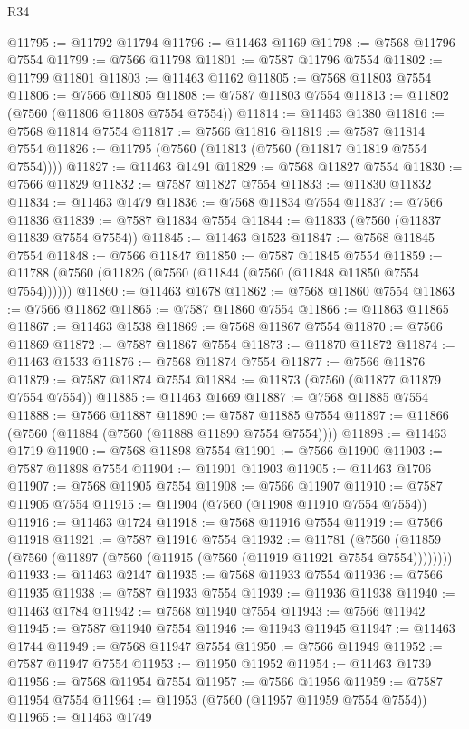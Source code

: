 \begin{lexlean}{R34}
\begin{coremodule}
@11795 := @11792 @11794
@11796 := @11463 @1169
@11798 := @7568 @11796 @7554
@11799 := @7566 @11798
@11801 := @7587 @11796 @7554
@11802 := @11799 @11801
@11803 := @11463 @1162
@11805 := @7568 @11803 @7554
@11806 := @7566 @11805
@11808 := @7587 @11803 @7554
@11813 := @11802 (@7560 (@11806 @11808 @7554 @7554))
@11814 := @11463 @1380
@11816 := @7568 @11814 @7554
@11817 := @7566 @11816
@11819 := @7587 @11814 @7554
@11826 := @11795 (@7560 (@11813 (@7560 (@11817 @11819 @7554 @7554))))
@11827 := @11463 @1491
@11829 := @7568 @11827 @7554
@11830 := @7566 @11829
@11832 := @7587 @11827 @7554
@11833 := @11830 @11832
@11834 := @11463 @1479
@11836 := @7568 @11834 @7554
@11837 := @7566 @11836
@11839 := @7587 @11834 @7554
@11844 := @11833 (@7560 (@11837 @11839 @7554 @7554))
@11845 := @11463 @1523
@11847 := @7568 @11845 @7554
@11848 := @7566 @11847
@11850 := @7587 @11845 @7554
@11859 := @11788 (@7560 (@11826 (@7560 (@11844 (@7560 (@11848 @11850 @7554 @7554))))))
@11860 := @11463 @1678
@11862 := @7568 @11860 @7554
@11863 := @7566 @11862
@11865 := @7587 @11860 @7554
@11866 := @11863 @11865
@11867 := @11463 @1538
@11869 := @7568 @11867 @7554
@11870 := @7566 @11869
@11872 := @7587 @11867 @7554
@11873 := @11870 @11872
@11874 := @11463 @1533
@11876 := @7568 @11874 @7554
@11877 := @7566 @11876
@11879 := @7587 @11874 @7554
@11884 := @11873 (@7560 (@11877 @11879 @7554 @7554))
@11885 := @11463 @1669
@11887 := @7568 @11885 @7554
@11888 := @7566 @11887
@11890 := @7587 @11885 @7554
@11897 := @11866 (@7560 (@11884 (@7560 (@11888 @11890 @7554 @7554))))
@11898 := @11463 @1719
@11900 := @7568 @11898 @7554
@11901 := @7566 @11900
@11903 := @7587 @11898 @7554
@11904 := @11901 @11903
@11905 := @11463 @1706
@11907 := @7568 @11905 @7554
@11908 := @7566 @11907
@11910 := @7587 @11905 @7554
@11915 := @11904 (@7560 (@11908 @11910 @7554 @7554))
@11916 := @11463 @1724
@11918 := @7568 @11916 @7554
@11919 := @7566 @11918
@11921 := @7587 @11916 @7554
@11932 := @11781
    (@7560 (@11859 (@7560 (@11897 (@7560 (@11915 (@7560 (@11919 @11921 @7554 @7554))))))))
@11933 := @11463 @2147
@11935 := @7568 @11933 @7554
@11936 := @7566 @11935
@11938 := @7587 @11933 @7554
@11939 := @11936 @11938
@11940 := @11463 @1784
@11942 := @7568 @11940 @7554
@11943 := @7566 @11942
@11945 := @7587 @11940 @7554
@11946 := @11943 @11945
@11947 := @11463 @1744
@11949 := @7568 @11947 @7554
@11950 := @7566 @11949
@11952 := @7587 @11947 @7554
@11953 := @11950 @11952
@11954 := @11463 @1739
@11956 := @7568 @11954 @7554
@11957 := @7566 @11956
@11959 := @7587 @11954 @7554
@11964 := @11953 (@7560 (@11957 @11959 @7554 @7554))
@11965 := @11463 @1749

\end{coremodule}
\end{lexlean}
